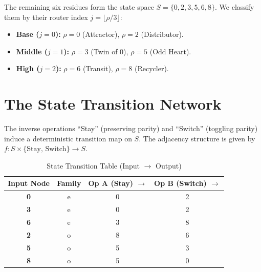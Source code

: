 \documentclass[11pt,letterpaper]{amsart}
\theoremstyle{definition}
\theoremstyle{plain}
\theoremstyle{plain}
\theoremstyle{remark}
\begin{document}
The remaining six residues form the state space $S = \{0, 2, 3, 5, 6, 8\}$. We classify them by their router index $j = \lfloor \rho/3 \rfloor$:
\begin{itemize}
    \item \textbf{Base ($j=0$):} $\rho=0$ (Attractor), $\rho=2$ (Distributor).
    \item \textbf{Middle ($j=1$):} $\rho=3$ (Twin of 0), $\rho=5$ (Odd Heart).
    \item \textbf{High ($j=2$):} $\rho=6$ (Transit), $\rho=8$ (Recycler).
\end{itemize}

\section{The State Transition Network}

The inverse operations ``Stay'' (preserving parity) and ``Switch'' (toggling parity) induce a deterministic transition map on $S$. The adjacency structure is given by $f: S \times \{\text{Stay, Switch}\} \to S$.

\begin{table}[H]
\centering
\caption{State Transition Table (Input $\to$ Output)}
\label{tab:transitions}
\begin{tabular}{@{}c c | c c@{}}
\toprule
Input Node & Family & \textbf{Op A (Stay)} $\to$ & \textbf{Op B (Switch)} $\to$ \\
\midrule
\textbf{0} & e & 0 & 2 \\
\textbf{3} & e & 0 & 2 \\
\textbf{6} & e & 3 & 8 \\
\midrule
\textbf{2} & o & 8 & 6 \\
\textbf{5} & o & 5 & 3 \\
\textbf{8} & o & 5 & 0 \\
\bottomrule
\end{tabular}
\end{table}
\end{document}
